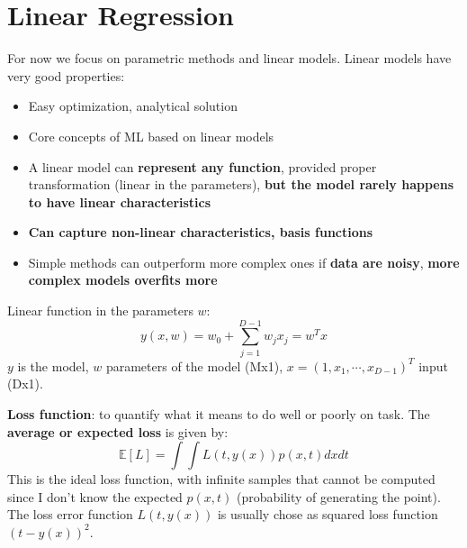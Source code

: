 
\section{Linear Regression}
    For now we focus on parametric methods and linear models. Linear models have very good properties:
    \begin{itemize}
        \item Easy optimization, analytical solution
        \item Core concepts of ML based on linear models
        \item A linear model can \textbf{represent any function}, provided proper transformation (linear in the parameters), \textbf{but the model rarely happens to have linear characteristics}
        \item \textbf{Can capture non-linear characteristics, basis functions}
        \item Simple methods can outperform more complex ones if \textbf{data are noisy}, \textbf{more complex models overfits more}
    \end{itemize}
    Linear function in the parameters $w$:
    $$y(x,w)=w_0+\sum_{j=1}^{D-1}w_jx_j=w^Tx$$
    $y$ is the model, $w$ parameters of the model (Mx1), $x=(1,x_1,\cdots,x_{D-1})^T$ input (Dx1).

    \textbf{Loss function}: to quantify what it means to do well or poorly on task. The \textbf{average or expected loss} is given by:
    $$\mathbb{E}[L]=\int\int L(t,y(x))p(x,t)dxdt$$
    This is the ideal loss function, with infinite samples that cannot be computed since I don't know the expected $p(x,t)$ (probability of generating the point). The loss error function $L(t,y(x))$ is usually chose as squared loss function $(t-y(x))^2$.

